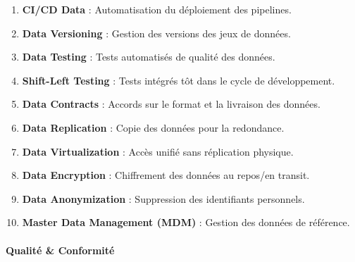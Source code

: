 \documentclass[
  letterpaper,
  DIV=11,
  numbers=noendperiod]{scrartcl}
\makeatletter
\let\oldparagraph\paragraph
\renewcommand{\paragraph}{
    \@ifstar
      \xxxParagraphStar
      \xxxParagraphNoStar
  }
\newcommand{\xxxParagraphStar}[1]{\oldparagraph*{#1}\mbox{}}
\newcommand{\xxxParagraphNoStar}[1]{\oldparagraph{#1}\mbox{}}
\providecommand{\tightlist}{%
  \setlength{\itemsep}{0pt}\setlength{\parskip}{0pt}}\usepackage{longtable,booktabs,array}
\makeatother
\begin{document}
\begin{enumerate}
\def\labelenumi{\arabic{enumi}.}
\setcounter{enumi}{20}
\tightlist
\item
  \textbf{CI/CD Data} : Automatisation du déploiement des pipelines.\\
\item
  \textbf{Data Versioning} : Gestion des versions des jeux de données.\\
\item
  \textbf{Data Testing} : Tests automatisés de qualité des données.\\
\item
  \textbf{Shift-Left Testing} : Tests intégrés tôt dans le cycle de
  développement.\\
\item
  \textbf{Data Contracts} : Accords sur le format et la livraison des
  données.\\
\item
  \textbf{Data Replication} : Copie des données pour la redondance.\\
\item
  \textbf{Data Virtualization} : Accès unifié sans réplication
  physique.\\
\item
  \textbf{Data Encryption} : Chiffrement des données au repos/en
  transit.\\
\item
  \textbf{Data Anonymization} : Suppression des identifiants
  personnels.\\
\item
  \textbf{Master Data Management (MDM)} : Gestion des données de
  référence.
\end{enumerate}

\paragraph{\texorpdfstring{\textbf{Qualité \&
Conformité}}{Qualité \& Conformité}}\label{qualituxe9-conformituxe9-1}
\end{document}
